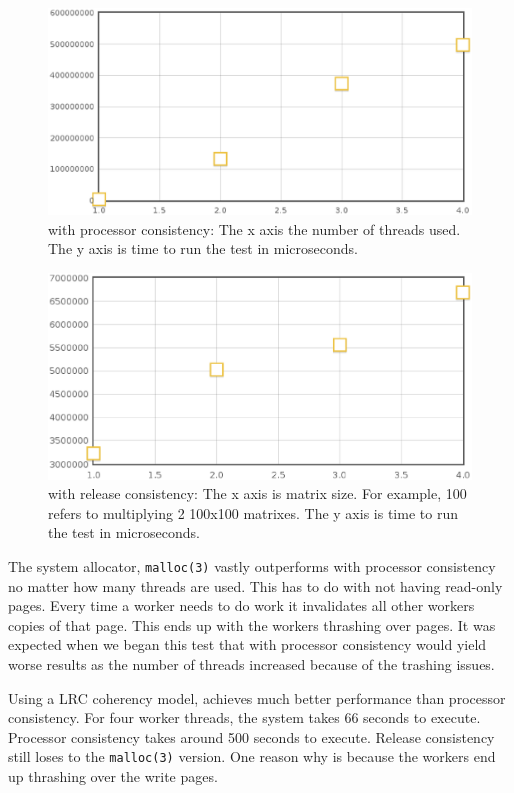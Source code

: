 \begin{figure}[!h]
\centering
\includegraphics[scale=0.40]{images/mmult-lh-fixed-size.eps}
\caption{\projname{} with processor consistency: The x axis the number of threads used. The y axis is time to run the test in microseconds.}
\end{figure}

\begin{figure}[!h]
\centering
\includegraphics[scale=0.40]{images/mmlh-fixed-size.eps}
\caption{\projname{} with release consistency: The x axis is matrix size. For example, 100 refers to multiplying 2 100x100 matrixes. The y axis is time to run the test in microseconds.}
\end{figure}

The system allocator, \verb,malloc(3), vastly outperforms \projname{} with processor consistency no matter how many threads are used.  This has to do with not having read-only pages.  Every time a worker needs to do work it invalidates all other workers copies of that page.  This ends up with the workers thrashing over pages.  It was expected when we began this test that \projname{} with processor consistency would yield worse results as the number of threads increased because of the trashing issues.

Using a LRC coherency model, \projname{} achieves much better performance than processor consistency.  For four worker threads, the system takes 66 seconds to execute.  Processor consistency takes around 500 seconds to execute.  Release consistency still loses to the \verb,malloc(3), version.  One reason why is because the workers end up thrashing over the write pages.

